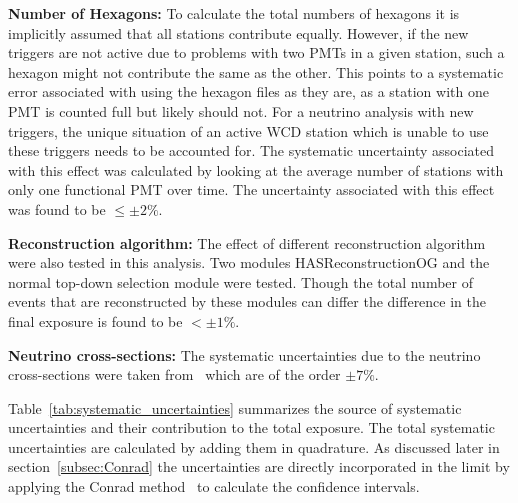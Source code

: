 \begin{description}
  \item \textbf{Number of Hexagons:} To calculate the total numbers of hexagons it is implicitly assumed that all stations contribute equally. However, if the new triggers are not active due to problems with two PMTs in a given station, such a hexagon might not contribute the same as the other. This points to a systematic error associated with using the hexagon files as they are, as a station with one PMT is counted full but likely should not. For a neutrino analysis with new triggers, the unique situation of an active WCD station which is unable to use these triggers needs to be accounted for. The systematic uncertainty associated with this effect was calculated by looking at the average number of stations with only one functional PMT over time. The uncertainty associated with this effect was found to be $\leq \pm 2\%$.
  \item \textbf{Reconstruction algorithm:} The effect of different reconstruction algorithm were also tested in this analysis. Two modules HASReconstructionOG and the normal top-down selection module were tested. Though the total number of events that are reconstructed by these modules can differ the difference in the final exposure is found to be $< \pm 1\%$. 
  \item \textbf{Neutrino cross-sections:} The systematic uncertainties due to the neutrino cross-sections were taken from~\cite{Cooper-Sarkar:2011jtt} which are of the order $\pm 7\%$.
\end{description}

Table~\ref{tab:systematic_uncertainties} summarizes the  source of systematic uncertainties and their contribution to the total exposure. The total systematic uncertainties are calculated by adding them in quadrature. As discussed later in section~\ref{subsec:Conrad} the uncertainties are directly incorporated in the limit by applying the Conrad method~\cite{Conrad:2002kn} to calculate the confidence intervals. 

